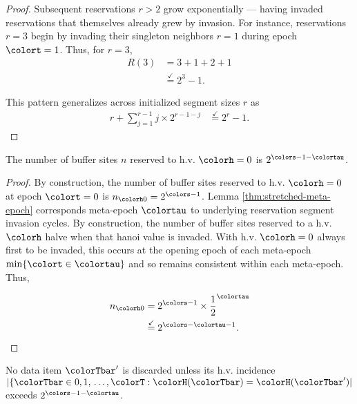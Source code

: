 \begin{proof}
Subsequent reservations $r>2$ grow exponentially --- having invaded reservations that themselves already grew by invasion.
For instance, reservations $r=3$ begin by invading their singleton neighbors $r=1$ during epoch $\colort=1$.
Thus, for $r=3$,
\begin{align*}
R(3)
&= 3 + 1 + 2 + 1\\
&\stackrel{\checkmark}{=} 2^3 - 1.
\end{align*}

This pattern generalizes across initialized segment sizes $r$ as
\begin{align*}
r + \sum_{j=1}^{r-1} j \times 2^{r-1-j}
&\stackrel{\checkmark}{=} 2^{r} - 1.
\end{align*}

\end{proof}

\begin{corollary}
\label{thm:num-hv0-reservations}
The number of buffer sites $n$ reserved to h.v. $\colorh=0$ is $2^{\colors-1-\colortau}$.
\end{corollary}

\begin{proof}
By construction, the number of buffer sites reserved to h.v. $\colorh=0$ at epoch $\colort=0$ is $n_{\colorh0}=2^{\colors - 1}$.
Lemma \ref{thm:stretched-meta-epoch} corresponds meta-epoch $\colortau$ to underlying reservation segment invasion cycles.
By construction, the number of buffer sites reserved to a h.v. $\colorh$ halve when that hanoi value is invaded.
With h.v. $\colorh=0$ always first to be invaded, this occurs at the opening epoch of each meta-epoch $\min\{\colort \in \colortau\}$ and so remains consistent within each meta-epoch.
Thus,

\begin{align*}
n_{\colorh0}
&= 2^{\colors - 1} \times \frac{1}{2}^{\colortau}\\
&\stackrel{\checkmark}{=} 2^{\colors - \colortau - 1}.
\end{align*}
\end{proof}

\begin{lemma}
\label{thm:discarded-incidence-count}
No data item $\colorTbar'$ is discarded unless its h.v. incidence $|\{\colorTbar \in 0,1,\,\ldots,\colorT : \colorH(\colorTbar) = \colorH(\colorTbar')|$ exceeds $2^{\colors - 1 - \colortau}$.
\end{lemma}

